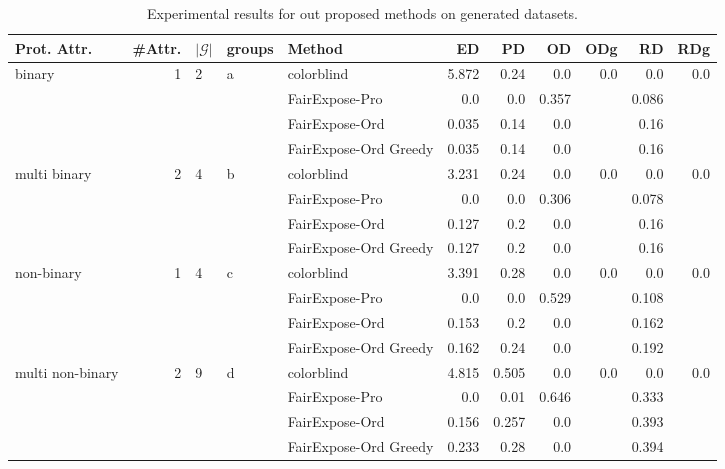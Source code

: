 \begin{table}[t]
    \caption{Experimental results for out proposed methods on generated datasets.}
    \label{tab:exp1}
    \centering
    \begin{tabular}{l r l l l r r r r r r}
    \toprule
    Prot. Attr. & \#Attr. & $|\mathcal{G}|$ & groups & Method & ED & PD & OD & ODg & RD & RDg \\
    \midrule
    \multirow{4}{*}{binary} & \multirow{4}{*}{1} & \multirow{4}{*}{2} & \multirow{4}{*}{a} & colorblind & 5.872 & 0.24 & 0.0 & \multirow{4}{*}{0.0} & 0.0 & \multirow{4}{*}{0.0} \\
     &  &  &  & FairExpose-Pro & 0.0 & 0.0 & 0.357 &  & 0.086 &  \\
     &  &  &  & FairExpose-Ord & 0.035 & 0.14 & 0.0 &  & 0.16 &  \\
     &  &  &  & FairExpose-Ord Greedy & 0.035 & 0.14 & 0.0 &  & 0.16 &  \\
    \hline
    \multirow{4}{*}{multi binary} & \multirow{4}{*}{2} & \multirow{4}{*}{4} & \multirow{4}{*}{b} & colorblind & 3.231 & 0.24 & 0.0 & \multirow{4}{*}{0.0} & 0.0 & \multirow{4}{*}{0.0} \\
     &  &  &  & FairExpose-Pro & 0.0 & 0.0 & 0.306 &  & 0.078 &  \\
     &  &  &  & FairExpose-Ord & 0.127 & 0.2 & 0.0 &  & 0.16 &  \\
     &  &  &  & FairExpose-Ord Greedy & 0.127 & 0.2 & 0.0 &  & 0.16 &  \\
    \hline
    \multirow{4}{*}{non-binary} & \multirow{4}{*}{1} & \multirow{4}{*}{4} & \multirow{4}{*}{c} & colorblind & 3.391 & 0.28 & 0.0 & \multirow{4}{*}{0.0} & 0.0 & \multirow{4}{*}{0.0} \\
     &  &  &  & FairExpose-Pro & 0.0 & 0.0 & 0.529 &  & 0.108 &  \\
     &  &  &  & FairExpose-Ord & 0.153 & 0.2 & 0.0 &  & 0.162 &  \\
     &  &  &  & FairExpose-Ord Greedy & 0.162 & 0.24 & 0.0 &  & 0.192 &  \\
    \hline
    \multirow{4}{*}{multi non-binary} & \multirow{4}{*}{2} & \multirow{4}{*}{9} & \multirow{4}{*}{d} & colorblind & 4.815 & 0.505 & 0.0 & \multirow{4}{*}{0.0} & 0.0 & \multirow{4}{*}{0.0} \\
     &  &  &  & FairExpose-Pro & 0.0 & 0.01 & 0.646 &  & 0.333 &  \\
     &  &  &  & FairExpose-Ord & 0.156 & 0.257 & 0.0 &  & 0.393 &  \\
     &  &  &  & FairExpose-Ord Greedy & 0.233 & 0.28 & 0.0 &  & 0.394 &  \\
    \bottomrule
    \end{tabular}
\end{table}